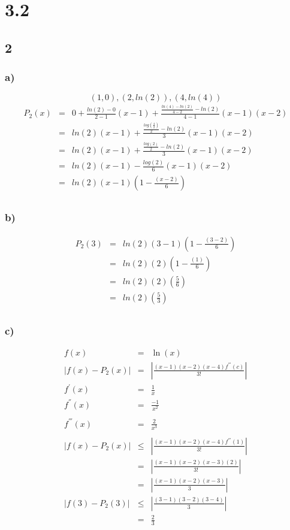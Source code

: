 \documentclass[12pt]{article}
\begin{document}
\section*{3.2}
\subsection*{2}
\subsubsection*{a)}
\[(1,0), (2,ln(2)), (4, ln(4))\]
\begin{eqnarray*}
  P_2(x) & = & 0 + \frac{ln(2) -0}{2-1}(x-1) + \frac{\frac{ln(4) - ln(2)}{4-2} - ln(2)}{4-1}(x-1)(x-2)\\
  & = & ln(2)(x-1) + \frac{\frac{log(\frac{4}{2})}{2} - ln(2)}{3}(x-1)(x-2)\\
  & = & ln(2)(x-1) + \frac{\frac{log(2)}{2} - ln(2)}{3}(x-1)(x-2)\\
  & = & ln(2)(x-1) - \frac{log(2)}{6}(x-1)(x-2)\\
  & = & ln(2)(x-1)(1 - \frac{(x-2)}{6})\\
\end{eqnarray*}
\subsubsection*{b)}
\begin{eqnarray*}
  P_2(3) & = & ln(2)(3-1)(1 - \frac{(3-2)}{6})\\
  & = & ln(2)(2)(1 - \frac{(1)}{6})\\
  & = & ln(2)(2)(\frac{5}{6})\\
  & = & ln(2)(\frac{5}{3})\\
\end{eqnarray*}
\subsubsection*{c)}
\begin{eqnarray*}
  f(x) & = & \ln(x)\\
  |f(x) - P_2(x)| & = & \left|\frac{(x-1)(x-2)(x-4)f^{'''}(c)}{3!}\right|\\
  f^{'}(x) & = & \frac{1}{x}\\
  f^{''}(x) & = & \frac{-1}{x^2}\\\\
  f^{'''}(x) & = & \frac{2}{x^3}\\\\
  |f(x) - P_2(x)| & \leq & \left|\frac{(x-1)(x-2)(x-4)f^{'''}(1)}{3!}\right|\\
  & = & \left|\frac{(x-1)(x-2)(x-3)(2)}{3!}\right|\\
  & = & \left|\frac{(x-1)(x-2)(x-3)}{3}\right|\\
  |f(3) - P_2(3)| & \leq & \left|\frac{(3-1)(3-2)(3-4)}{3}\right|\\
  & = & \frac{2}{3}\\
\end{eqnarray*}
\end{document}
